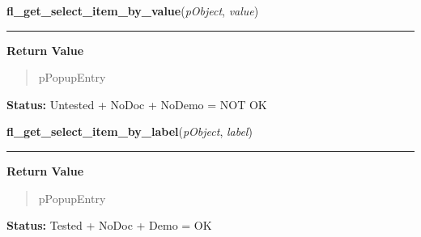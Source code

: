 \hspace{.8\funcindent}\begin{boxedminipage}{\funcwidth}

    \raggedright \textbf{fl\_get\_select\_item\_by\_value}(\textit{pObject}, \textit{value})

    \vspace{-1.5ex}

    \rule{\textwidth}{0.5\fboxrule}
\setlength{\parskip}{2ex}
\setlength{\parskip}{1ex}
      \textbf{Return Value}
    \vspace{-1ex}

      \begin{quote}
      pPopupEntry

      \end{quote}

\textbf{Status:} Untested + NoDoc + NoDemo = NOT OK



    \end{boxedminipage}

    \label{xformslib:library:fl_get_select_item_by_label}

    \vspace{0.5ex}

\hspace{.8\funcindent}\begin{boxedminipage}{\funcwidth}

    \raggedright \textbf{fl\_get\_select\_item\_by\_label}(\textit{pObject}, \textit{label})

    \vspace{-1.5ex}

    \rule{\textwidth}{0.5\fboxrule}
\setlength{\parskip}{2ex}
\setlength{\parskip}{1ex}
      \textbf{Return Value}
    \vspace{-1ex}

      \begin{quote}
      pPopupEntry

      \end{quote}

\textbf{Status:} Tested + NoDoc + Demo = OK



    \end{boxedminipage}

    \label{xformslib:library:fl_get_select_item_by_text}

